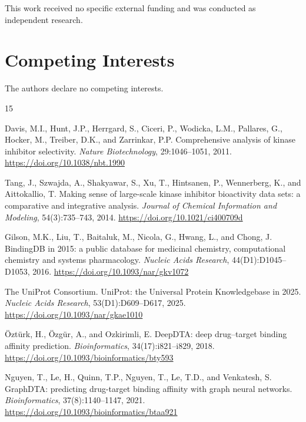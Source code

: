 \documentclass[11pt]{article}
\begin{document}
This work received no specific external funding and was conducted as
independent research.

\section*{Competing Interests}

The authors declare no competing interests.

\begin{thebibliography}{15}

Davis, M.I., Hunt, J.P., Herrgard, S., Ciceri, P., Wodicka, L.M.,
Pallares, G., Hocker, M., Treiber, D.K., and Zarrinkar, P.P.
\newblock Comprehensive analysis of kinase inhibitor selectivity.
\newblock \emph{Nature Biotechnology}, 29:1046--1051, 2011.
\newblock \url{https://doi.org/10.1038/nbt.1990}

Tang, J., Szwajda, A., Shakyawar, S., Xu, T., Hintsanen, P., Wennerberg, K.,
and Aittokallio, T.
\newblock Making sense of large-scale kinase inhibitor bioactivity data sets:
a comparative and integrative analysis.
\newblock \emph{Journal of Chemical Information and Modeling}, 54(3):735--743,
2014.
\newblock \url{https://doi.org/10.1021/ci400709d}

Gilson, M.K., Liu, T., Baitaluk, M., Nicola, G., Hwang, L., and Chong, J.
\newblock BindingDB in 2015: a public database for medicinal chemistry,
computational chemistry and systems pharmacology.
\newblock \emph{Nucleic Acids Research}, 44(D1):D1045--D1053, 2016.
\newblock \url{https://doi.org/10.1093/nar/gkv1072}

The UniProt Consortium.
\newblock UniProt: the Universal Protein Knowledgebase in 2025.
\newblock \emph{Nucleic Acids Research}, 53(D1):D609--D617, 2025.
\newblock \url{https://doi.org/10.1093/nar/gkae1010}

\"{O}zt\"{u}rk, H., \"{O}zg\"{u}r, A., and Ozkirimli, E.
\newblock DeepDTA: deep drug--target binding affinity prediction.
\newblock \emph{Bioinformatics}, 34(17):i821--i829, 2018.
\newblock \url{https://doi.org/10.1093/bioinformatics/bty593}

Nguyen, T., Le, H., Quinn, T.P., Nguyen, T., Le, T.D., and Venkatesh, S.
\newblock GraphDTA: predicting drug-target binding affinity with graph neural
networks.
\newblock \emph{Bioinformatics}, 37(8):1140--1147, 2021.
\newblock \url{https://doi.org/10.1093/bioinformatics/btaa921}


\end{thebibliography}
\end{document}
